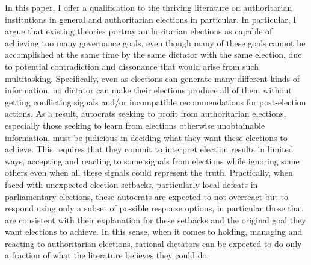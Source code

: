 \documentclass[12pt]{article}
\newcommand{\1}{\mathbbm{1}}
\begin{document}
In this paper, I offer a qualification to the thriving literature on authoritarian institutions in general and authoritarian elections in particular. In particular, I argue that existing theories portray authoritarian elections as capable of achieving too many governance goals, even though many of these goals cannot be accomplished at the same time by the same dictator with the same election, due to potential contradiction and dissonance that would arise from such multitasking. Specifically, even as elections can generate many different kinds of information, no dictator can make their elections produce all of them without getting conflicting signals and/or incompatible recommendations for post-election actions. As a result, autocrats seeking to profit from authoritarian elections, especially those seeking to learn from elections otherwise unobtainable information, must be judicious in deciding what they want these elections to achieve. This requires that they commit to interpret election results in limited ways, accepting and reacting to some signals from elections while ignoring some others even when all these signals could represent the truth. Practically, when faced with unexpected election setbacks, particularly local defeats in parliamentary elections, these autocrats are expected to not overreact but to respond using only a subset of possible response options, in particular those that are consistent with their explanation for these setbacks and the original goal they want elections to achieve. In this sense, when it comes to holding, managing and reacting to authoritarian elections, rational dictators can be expected to do only a fraction of what the literature believes they could do.
\end{document}
